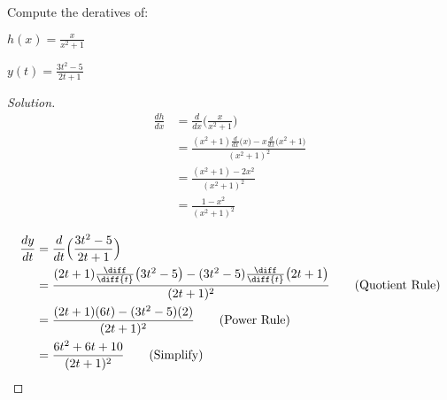 \documentclass[crop=false,class=article,oneside]{standalone}
\begin{document}
            \begin{problem}
                Compute the deratives of:
                \begin{enumerate}[label=(\alph*)]
                    \begin{multicols}{2}
                        \item $h(x)=\frac{x}{x^{2}+1}$
                        \item $y(t)=\frac{3t^{2}-5}{2t+1}$
                    \end{multicols}
                \end{enumerate}
            \end{problem}
            \begin{proof}[Solution]
                \par\hfill\par
                \begin{minipage}[b]{.49\textwidth}
                    \centering
                    \begin{align*}
                        \frac{dh}{dx}
                        &=\frac{d}{dx}\Big(\frac{x}{x^{2}+1}\Big)\\
                        &=\frac{(x^{2}+1)\frac{d}{dx}\big(x\big)-
                               x\frac{d}{dx}\big(x^{2}+1\big)}
                              {(x^{2}+1)^{2}}
                            \tag{Quotient Rule}\\
                        &=\frac{(x^{2}+1)-2x^{2}}{(x^{2}+1)^{2}}
                            \tag{Power Rule}\\
                        &=\frac{1-x^{2}}{(x^{2}+1)^{2}}
                            \tag{Simplify}
                    \end{align*}
                \end{minipage}
                \hfill
                \vline
                \begin{minipage}[b]{.49\textwidth}
                    \centering
                    \begin{align*}
                        \frac{dy}{dt}
                        &=\frac{d}{dt}\Big(\frac{3t^{2}-5}{2t+1}\Big)\\
                        &=\frac{(2t+1)\frac{\diff}{\diff{t}}
                                \big(3t^{2}-5\big)-(3t^{2}-5)
                                \frac{\diff}{\diff{t}}\big(2t+1\big)}
                               {{(2t+1)^{2}}}
                                \tag{Quotient Rule}\\
                        &=\frac{(2t+1)(6t)-(3t^{2}-5)(2)}
                               {(2t+1)^{2}}
                            \tag{Power Rule}\\
                        &=\frac{6t^{2}+6t+10}{(2t+1)^{2}}
                            \tag{Simplify}
                    \end{align*}
                \end{minipage}
            \end{proof}
\end{document}
